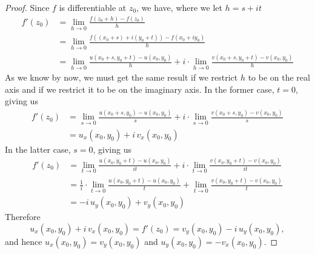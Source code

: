 \begin{proof}
Since $f$ is differentiable at $z_0$, we have, where we let $h = s + it$
\begin{align*}
f'(z_0) &= \lim_{h\to 0}\frac{f(z_0 + h) - f(z_0)}{h}\\[0.5em]
&= \lim_{h\to 0}\frac{f((x_0 + s) + i(y_0 + t)) - f(x_0 + iy_0)}{h}\\[0.5em]
&= \lim_{h\to 0}\frac{u(x_0 + s,y_0 + t) - u(x_0,y_0)}{h} + i\cdot\lim_{h\to 0}\frac{v(x_0 + s,y_0 + t) - v(x_0,y_0)}{h}
\end{align*}
As we know by now, we must get the same result if we restrict $h$ to be on the real axis and if we restrict it to be on the imaginary axis. In the former case, $t = 0$, giving us
\begin{align*}
f'(z_0) &= \lim_{s\to 0}\frac{u(x_0 + s,y_0) - u(x_0,y_0)}{s} + i\cdot\lim_{s\to 0}\frac{v(x_0 + s,y_0) - v(x_0,y_0)}{s}\\[0.5em]
&= u_x(x_0,y_0) + i\,v_x(x_0,y_0)
\end{align*}
In the latter case, $s = 0$, giving us
\begin{align*}
f'(z_0) &= \lim_{t\to 0}\frac{u(x_0,y_0 + t) - u(x_0,y_0)}{it} + i\cdot\lim_{t\to 0}\frac{v(x_0,y_0 + t) - v(x_0,y_0)}{it}\\[0.5em]
&= \frac{1}{i}\cdot\lim_{t\to 0}\frac{u(x_0,y_0 + t) - u(x_0,y_0)}{t} + \lim_{t\to 0}\frac{v(x_0,y_0 + t) - v(x_0,y_0)}{t}\\[0.5em]
&= -i\,u_y(x_0,y_0) + v_y(x_0,y_0)
\end{align*}
Therefore
\[u_x(x_0,y_0) + i\,v_x(x_0,y_0) = f'(z_0) = v_y(x_0,y_0)-i\,u_y(x_0,y_0),\]
and hence $u_x(x_0,y_0) = v_y(x_0,y_0)$ and $u_y(x_0,y_0) = -v_x(x_0,y_0)$.
\end{proof}


